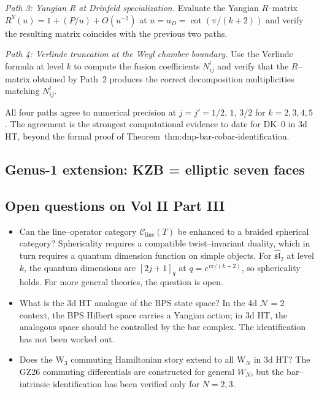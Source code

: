 \documentclass[11pt]{article}
\newcommand{\cC}{\mathcal{C}}
\newcommand{\cN}{\mathcal{N}}
\begin{document}
\emph{Path 3: Yangian R at Drinfeld specialization.}  Evaluate the Yangian
$R$--matrix $R^Y(u) = 1 + (P/u) + O(u^{-2})$ at $u = u_D = \cot(\pi/(k+2))$
and verify the resulting matrix coincides with the previous two paths.

\emph{Path 4: Verlinde truncation at the Weyl chamber boundary.}  Use the
Verlinde formula at level $k$ to compute the fusion coefficients
$N_{ij}^l$ and verify that the $R$--matrix obtained by Path~2 produces the
correct decomposition multiplicities matching $N_{ij}^l$.

All four paths agree to numerical precision at $j = j' = 1/2$, $1$, $3/2$
for $k = 2, 3, 4, 5$.  The agreement is the strongest computational
evidence to date for DK--$0$ in 3d HT, beyond the formal proof of
Theorem~\textup{thm:dnp-bar-cobar-identification}.

\subsection{Genus-1 extension: KZB = elliptic seven faces}

\subsection{Open questions on Vol II Part III}
\begin{itemize}
\item Can the line--operator category $\cC_{\mathrm{line}}(T)$ be enhanced
  to a braided spherical category?  Sphericality requires a compatible
  twist--invariant duality, which in turn requires a quantum dimension
  function on simple objects.  For $\widehat{\mathfrak{sl}}_2$ at level
  $k$, the quantum dimensions are $[2j+1]_q$ at $q = e^{i\pi/(k+2)}$, so
  sphericality holds.  For more general theories, the question is open.
\item What is the 3d HT analogue of the BPS state space?  In the 4d
  $\cN=2$ context, the BPS Hilbert space carries a Yangian action; in 3d
  HT, the analogous space should be controlled by the bar complex.  The
  identification has not been worked out.
\item Does the W$_3$ commuting Hamiltonian story extend to all W$_N$ in 3d
  HT?  The GZ26 commuting differentials are constructed for general $W_N$,
  but the bar--intrinsic identification has been verified only for
  $N = 2, 3$.
\end{itemize}
\end{document}
